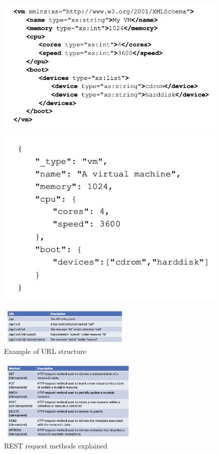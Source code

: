 \documentclass[10pt,a4paper]{article}
\begin{document}
\begin{figure}[h!]
\centering
\begin{minipage}{.5\textwidth}
  \centering
  \includegraphics[width=.6\linewidth]{images/rest1.png}
  \label{fig:rest1}
\end{minipage}%
\begin{minipage}{.5\textwidth}
  \centering
  \includegraphics[width=.6\linewidth]{images/rest2.png}
  \label{fig:rest2}
\end{minipage}
\end{figure} 
\begin{figure}[ht!]
 \hfill \includegraphics[width=180pt]{images/rest-collections}\hspace*{\fill}
 \caption{Example of URL structure}
  \label{fig:url-structure}
\end{figure}
\begin{figure}[ht!]
 \hfill \includegraphics[width=190pt]{images/rest-op}\hspace*{\fill}
 \caption{REST request methods explained}
  \label{fig:rest-op}
\end{figure}
\end{document}
